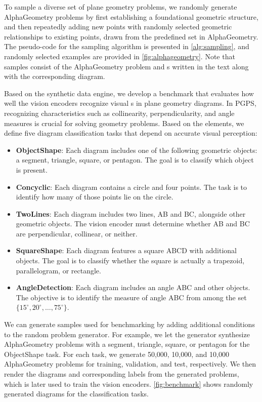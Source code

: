 To sample a diverse set of plane geometry problems, we randomly generate AlphaGeometry problems by first establishing a foundational geometric structure, and then repeatedly adding new points with randomly selected geometric relationships to existing points, drawn from the predefined set in AlphaGeometry. The pseudo-code for the sampling algorithm is presented in \cref{alg:sampling}, and randomly selected examples are provided in \cref{fig:alphageometry}. Note that samples consist of the AlphaGeometry problem and \geofeat{}s written in the text along with the corresponding diagram.

Based on the synthetic data engine, we develop a benchmark that evaluates how well the vision encoders recognize visual \geofeat{}s in plane geometry diagrams. In PGPS, recognizing characteristics such as collinearity, perpendicularity, and angle measures is crucial for solving geometry problems. Based on the elements, we define five diagram classification tasks that depend on accurate visual \geofeat{} perception:
\begin{itemize}
    \item \textbf{ObjectShape}: Each diagram includes one of the following geometric objects: a segment, triangle, square, or pentagon. The goal is to classify which object is present.
    \item \textbf{Concyclic}: Each diagram contains a circle and four points. The task is to identify how many of those points lie on the circle.  
    \item \textbf{TwoLines}: Each diagram includes two lines, AB and BC, alongside other geometric objects. The vision encoder must determine whether AB and BC are perpendicular, collinear, or neither.
    \item \textbf{SquareShape}: Each diagram features a square ABCD with additional objects. The goal is to classify whether the square is actually a trapezoid, parallelogram, or rectangle. 
    \item \textbf{AngleDetection}: Each diagram includes an angle ABC and other objects. The objective is to identify the measure of angle ABC from among the set \(\{15^\circ, 20^\circ, \ldots, 75^\circ\}\). 
\end{itemize}
We can generate samples used for benchmarking by adding additional conditions to the random problem generator. For example, we let the generator synthesize AlphaGeometry problems with a segment, triangle, square, or pentagon for the ObjectShape task.
For each task, we generate 50,000, 10,000, and 10,000 AlphaGeometry problems for training, validation, and test, respectively.
We then render the diagrams and corresponding labels from the generated problems, which is later used to train the vision encoders.
\cref{fig:benchmark} shows randomly generated diagrams for the classification tasks.
\fi


